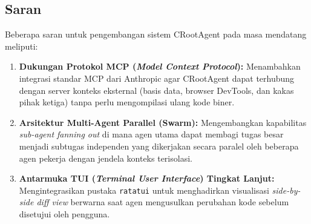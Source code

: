 \subsection{Saran}
Beberapa saran untuk pengembangan sistem CRootAgent pada masa mendatang meliputi:
\begin{enumerate}
    \item \textbf{Dukungan Protokol MCP (\textit{Model Context Protocol}):} Menambahkan integrasi standar MCP dari Anthropic agar CRootAgent dapat terhubung dengan server konteks eksternal (basis data, browser DevTools, dan kakas pihak ketiga) tanpa perlu mengompilasi ulang kode biner.
    \item \textbf{Arsitektur Multi-Agent Parallel (Swarm):} Mengembangkan kapabilitas \textit{sub-agent fanning out} di mana agen utama dapat membagi tugas besar menjadi subtugas independen yang dikerjakan secara paralel oleh beberapa agen pekerja dengan jendela konteks terisolasi.
    \item \textbf{Antarmuka TUI (\textit{Terminal User Interface}) Tingkat Lanjut:} Mengintegrasikan pustaka \texttt{ratatui} untuk menghadirkan visualisasi \textit{side-by-side diff view} berwarna saat agen mengusulkan perubahan kode sebelum disetujui oleh pengguna.
\end{enumerate}
